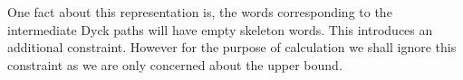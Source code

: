 \documentclass[12pt]{article}
\numberwithin{equation}{section}
\numberwithin{equation}{section}
\theoremstyle{definition}
\renewcommand{\1}{\bf 1}
\begin{document}

\noindent 
One fact about this representation is, the words corresponding to the intermediate Dyck paths will have empty skeleton words. This introduces an additional constraint. However for the purpose of calculation we shall ignore this constraint as we are only concerned about the upper bound.  
\end{document}
